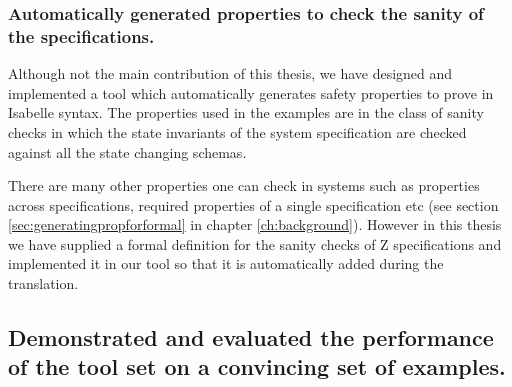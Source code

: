%

\subsubsection{Automatically generated properties to check the sanity of the specifications.}

Although not the main contribution of this thesis, we have designed and
implemented a tool which automatically generates safety properties to prove in
Isabelle syntax. The properties used in the examples are in the class of sanity
checks in which the state invariants of the system specification are checked
against all the state changing schemas.

There are many other properties one can check in systems such as properties
across specifications, required properties of a single specification etc (see
section \ref{sec:generatingpropforformal} in chapter \ref{ch:background}).
However in this thesis we have supplied a formal definition for the sanity
checks of Z specifications and implemented it in our tool so that it is
automatically added during the translation.


\subsection{Demonstrated and evaluated the performance of the tool set on a convincing set of examples.}

